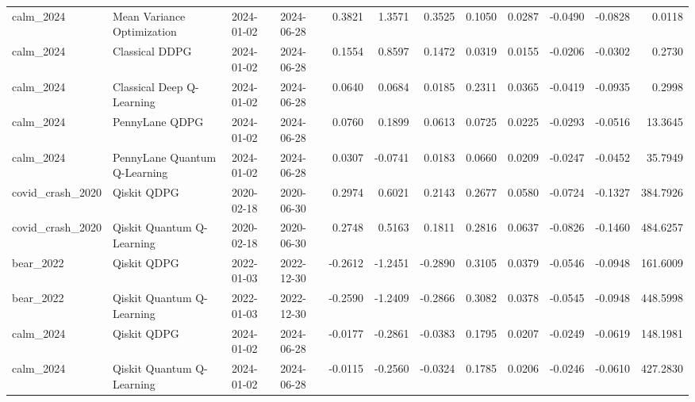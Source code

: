 \begin{tabular}{llllrrrrrrrr}
calm_2024 & Mean Variance Optimization & 2024-01-02 & 2024-06-28 & 0.3821 & 1.3571 & 0.3525 & 0.1050 & 0.0287 & -0.0490 & -0.0828 & 0.0118 \\
calm_2024 & Classical DDPG & 2024-01-02 & 2024-06-28 & 0.1554 & 0.8597 & 0.1472 & 0.0319 & 0.0155 & -0.0206 & -0.0302 & 0.2730 \\
calm_2024 & Classical Deep Q-Learning & 2024-01-02 & 2024-06-28 & 0.0640 & 0.0684 & 0.0185 & 0.2311 & 0.0365 & -0.0419 & -0.0935 & 0.2998 \\
calm_2024 & PennyLane QDPG & 2024-01-02 & 2024-06-28 & 0.0760 & 0.1899 & 0.0613 & 0.0725 & 0.0225 & -0.0293 & -0.0516 & 13.3645 \\
calm_2024 & PennyLane Quantum Q-Learning & 2024-01-02 & 2024-06-28 & 0.0307 & -0.0741 & 0.0183 & 0.0660 & 0.0209 & -0.0247 & -0.0452 & 35.7949 \\
covid_crash_2020 & Qiskit QDPG & 2020-02-18 & 2020-06-30 & 0.2974 & 0.6021 & 0.2143 & 0.2677 & 0.0580 & -0.0724 & -0.1327 & 384.7926 \\
covid_crash_2020 & Qiskit Quantum Q-Learning & 2020-02-18 & 2020-06-30 & 0.2748 & 0.5163 & 0.1811 & 0.2816 & 0.0637 & -0.0826 & -0.1460 & 484.6257 \\
bear_2022 & Qiskit QDPG & 2022-01-03 & 2022-12-30 & -0.2612 & -1.2451 & -0.2890 & 0.3105 & 0.0379 & -0.0546 & -0.0948 & 161.6009 \\
bear_2022 & Qiskit Quantum Q-Learning & 2022-01-03 & 2022-12-30 & -0.2590 & -1.2409 & -0.2866 & 0.3082 & 0.0378 & -0.0545 & -0.0948 & 448.5998 \\
calm_2024 & Qiskit QDPG & 2024-01-02 & 2024-06-28 & -0.0177 & -0.2861 & -0.0383 & 0.1795 & 0.0207 & -0.0249 & -0.0619 & 148.1981 \\
calm_2024 & Qiskit Quantum Q-Learning & 2024-01-02 & 2024-06-28 & -0.0115 & -0.2560 & -0.0324 & 0.1785 & 0.0206 & -0.0246 & -0.0610 & 427.2830 \\
\bottomrule
\end{tabular}
